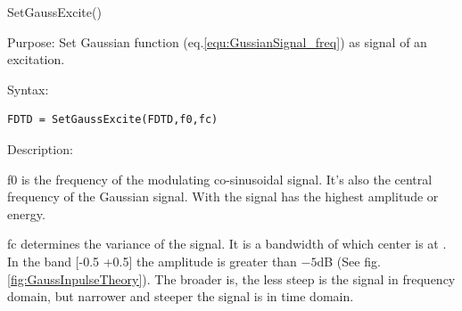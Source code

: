 \begin{FontNameFunct}{SetGaussExcite()}
 \label{func:SetGaussExcite}
\end{FontNameFunct}

\begin{FontDescr}{Purpose:}
 Set  Gaussian function (eq.\ref{equ:GussianSignal_freq}) as  signal of an excitation.  
\end{FontDescr}

\begin{FontDescr}{Syntax:}
      \begin{lstlisting}
FDTD = SetGaussExcite(FDTD,f0,fc)
      \end{lstlisting}
\end{FontDescr}

\begin{FontDescr}{Description:}
    \begin{FontPara}{f0}  \label{para:f0}
     is the frequency of the modulating co-sinusoidal signal. It's also the central frequency of the Gaussian signal. With  the signal has the highest amplitude or energy.
    \end{FontPara}
    \begin{FontPara}{fc}  \label{para:fc}
		 determines the variance of the signal. It is a  bandwidth of which center is at . In the band [-0.5 \quad {}+0.5] the amplitude  is greater than  $-5$dB (See fig. \ref{fig:GaussInpulseTheory}).
The broader  is, the less steep is the signal in frequency domain, but narrower  and steeper the signal is in time domain.
    \end{FontPara} 
\end{FontDescr}


